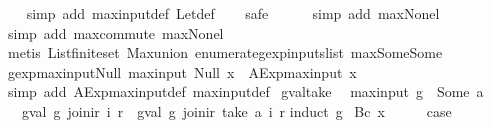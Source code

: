 \begin{isabellebody}
%
\isadelimproof
\ \ %
\endisadelimproof
%
\isatagproof
{}\isamarkupfalse%
\ {\isacharparenleft}simp\ add{\isacharcolon}\ max{\isacharunderscore}input{\isacharunderscore}def\ Let{\isacharunderscore}def{\isacharparenright}\isanewline
\ \ \isamarkupfalse%
\ safe\isanewline
\ \ \ \ \isamarkupfalse%
\ {\isacharparenleft}simp\ add{\isacharcolon}\ max{\isacharunderscore}None{\isacharunderscore}l{\isacharparenright}\isanewline
\ \ \ \isamarkupfalse%
\ {\isacharparenleft}simp\ add{\isacharcolon}\ max{\isachardot}commute\ max{\isacharunderscore}None{\isacharunderscore}l{\isacharparenright}\isanewline
\ \ \isamarkupfalse%
\ {\isacharparenleft}metis\ List{\isachardot}finite{\isacharunderscore}set\ Max{\isachardot}union\ enumerate{\isacharunderscore}gexp{\isacharunderscore}inputs{\isacharunderscore}list\ max{\isacharunderscore}Some{\isacharunderscore}Some{\isacharparenright}%
\endisatagproof
{\isafoldproof}%
%
\isadelimproof
\isanewline
%
\endisadelimproof
\isanewline
{}\isamarkupfalse%
\ gexp{\isacharunderscore}max{\isacharunderscore}input{\isacharunderscore}Null{\isacharcolon}\ {\isachardoublequoteopen}max{\isacharunderscore}input\ {\isacharparenleft}Null\ x{\isacharparenright}\ {\isacharequal}\ AExp{\isachardot}max{\isacharunderscore}input\ x{\isachardoublequoteclose}\isanewline
%
\isadelimproof
\ \ %
\endisadelimproof
%
\isatagproof
{}\isamarkupfalse%
\ {\isacharparenleft}simp\ add{\isacharcolon}\ AExp{\isachardot}max{\isacharunderscore}input{\isacharunderscore}def\ max{\isacharunderscore}input{\isacharunderscore}def{\isacharparenright}%
\endisatagproof
{\isafoldproof}%
%
\isadelimproof
\isanewline
%
\endisadelimproof
\isanewline
{}\isamarkupfalse%
\ gval{\isacharunderscore}take{\isacharcolon}\isanewline
\ \ {\isachardoublequoteopen}max{\isacharunderscore}input\ g\ {\isacharless}\ Some\ a\ {\isasymLongrightarrow}\isanewline
\ \ \ gval\ g\ {\isacharparenleft}join{\isacharunderscore}ir\ i\ r{\isacharparenright}\ {\isacharequal}\ gval\ g\ {\isacharparenleft}join{\isacharunderscore}ir\ {\isacharparenleft}take\ a\ i{\isacharparenright}\ r{\isacharparenright}{\isachardoublequoteclose}\isanewline
%
\isadelimproof
%
\endisadelimproof
%
\isatagproof
{}\isamarkupfalse%
{\isacharparenleft}induct\ g{\isacharparenright}\isanewline
{}\isamarkupfalse%
\ {\isacharparenleft}Bc\ x{\isacharparenright}\isanewline
\ \ \isamarkupfalse%
\ \isamarkupfalse%
\ {\isacharquery}case\isanewline
\ \ \ \ \isamarkupfalse%

\end{isabellebody}
